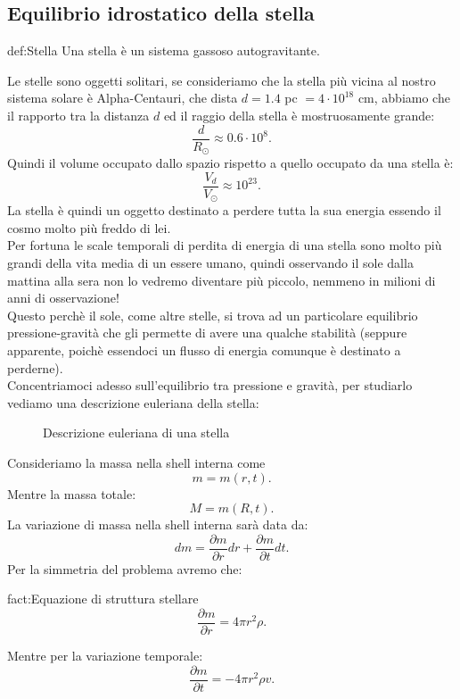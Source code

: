 \subsection{Equilibrio idrostatico della stella}
\label{subsec:Equilibrio idrostatico della stella}
\begin{defn}[Stella]{def:Stella}
	Una stella è un sistema gassoso autogravitante.
\end{defn}
Le stelle sono oggetti solitari, se consideriamo che la stella più vicina al nostro sistema solare è Alpha-Centauri, che dista $ d = 1.4$ pc $= 4\cdot 10^{18}$ cm, abbiamo che il rapporto tra la distanza $d$ ed il raggio della stella è mostruosamente grande:
\[
	\frac{d}{R_{\odot}} \approx 0.6 \cdot 10^{8} 
.\] 
Quindi il volume occupato dallo spazio rispetto a quello occupato da una stella è:
\[
	\frac{V_d}{V_{\odot}}\approx 10^{23}
.\] 
La stella è quindi un oggetto destinato a perdere tutta la sua energia essendo il cosmo molto più freddo di lei.\\
Per fortuna le scale temporali di perdita di energia di una stella sono molto più grandi della vita media di un essere umano, quindi osservando il sole dalla mattina alla sera non lo vedremo diventare più piccolo, nemmeno in milioni di anni di osservazione!\\
Questo perchè il sole, come altre stelle, si trova ad un particolare equilibrio pressione-gravità che gli permette di avere una qualche stabilità (seppure apparente, poichè essendoci un flusso di energia comunque è destinato a perderne).\\
Concentriamoci adesso sull'equilibrio tra pressione e gravità, per studiarlo vediamo una descrizione euleriana della stella:
\begin{figure}[H]
    \centering
    \caption{Descrizione euleriana di una stella}
    \label{fig:descrizione-euleriana-di-una-stella}
\end{figure}
\noindent
Consideriamo la massa nella shell interna come 
\[
	m = m(r,t)	
.\] 
Mentre la massa totale:
\[
	M = m(R,t)
.\] 
La variazione di massa nella shell interna sarà data da:
\[
	dm 
	=
	\frac{\partial m}{\partial r} dr +
	\frac{\partial m}{\partial t} dt
.\] 
Per la simmetria del problema avremo che:
\begin{fact}{fact:Equazione di struttura stellare}
	\[
	\frac{\partial m}{\partial r} = 4\pi r^2 \rho
.\] 
\end{fact}
Mentre per la variazione temporale:
\[
	\frac{\partial m}{\partial t} =
	-4\pi r^2 \rho  v
.\] 
